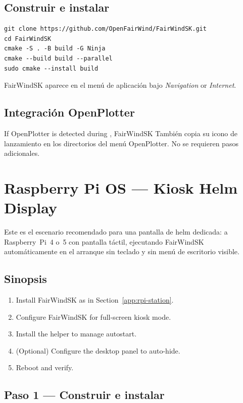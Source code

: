 \subsection{Construir e instalar}

\begin{lstlisting}
git clone https://github.com/OpenFairWind/FairWindSK.git
cd FairWindSK
cmake -S . -B build -G Ninja
cmake --build build --parallel
sudo cmake --install build
\end{lstlisting}

FairWindSK aparece en el menú de aplicación bajo
\textit{Navigation} or \textit{Internet}.

\subsection{Integración OpenPlotter}

If OpenPlotter is detected during , FairWindSK
También copia su icono de lanzamiento en los directorios del menú OpenPlotter.
No se requieren pasos adicionales.

\section{Raspberry Pi OS --- Kiosk Helm Display}
\label{app:rpi-kiosk}

Este es el escenario recomendado para una pantalla de helm dedicada:
a Raspberry~Pi~4 o~5 con pantalla táctil, ejecutando FairWindSK automáticamente
en el arranque sin teclado y sin menú de escritorio visible.

\subsection{Sinopsis}

\begin{enumerate}
  \item Install FairWindSK as in Section~\ref{app:rpi-station}.
  \item Configure FairWindSK for full-screen kiosk mode.
  \item Install the  helper to manage autostart.
  \item (Optional) Configure the desktop panel to auto-hide.
  \item Reboot and verify.
\end{enumerate}

\subsection{Paso 1 --- Construir e instalar}

